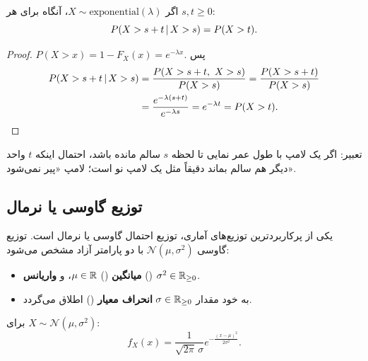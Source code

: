 \begin{theorem}
اگر $X\sim\mathrm{exponential}(\lambda)$، آنگاه برای هر $s,t\ge0$:
\[
P(X>s+t\,|\, X>s)=P(X>t).
\]
\end{theorem}
\begin{proof}
$P(X>x)=1-F_X(x)=e^{-\lambda x}$. پس
\[
\begin{aligned}
P(X>s+t\given X>s)&=\frac{P(X>s+t,\ X>s)}{P(X>s)}=\frac{P(X>s+t)}{P(X>s)}\\
&=\frac{e^{-\lambda(s+t)}}{e^{-\lambda s}}=e^{-\lambda t}=P(X>t).
\end{aligned}
\]
\end{proof}
تعبیر: اگر یک لامپ با طول عمر نمایی تا لحظه $s$ سالم مانده باشد، احتمال اینکه $t$ واحد دیگر هم سالم بماند دقیقاً مثل یک لامپ نو است؛ لامپ «پیر نمی‌شود».

\subsection{توزیع گاوسی یا نرمال }
یکی از پرکاربردترین توزیع‌های آماری، توزیع احتمال گاوسی یا نرمال است. توزیع گاوسی $\mathcal N(\mu,\sigma^2)$ با دو پارامتر آزاد مشخص می‌شود:
\begin{itemize}
\item \textbf{میانگین} () $\mu\in\mathbb{R}$، و \textbf{واریانس} () $\sigma^2\in\mathbb{R}_{\ge0}$.
\item به خود مقدار $\sigma\in\mathbb{R}_{\ge0}$ \textbf{انحراف معیار} () اطلاق می‌گردد.
\end{itemize}

\begin{definition}
برای $X\sim\mathcal N(\mu,\sigma^2)$:
\[
f_X(x)=\frac{1}{\sqrt{2\pi}\,\sigma}e^{-\frac{(x-\mu)^2}{2\sigma^2}} .
\]
\end{definition}

\begin{center}
\end{center}

